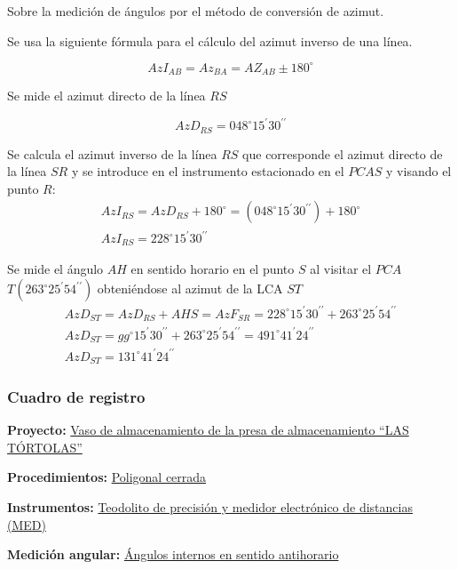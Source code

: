 Sobre la medición de ángulos por el método de conversión de azimut.

Se usa la siguiente fórmula para el cálculo del azimut inverso de una línea.

\begin{equation}
    AzI_{AB}=Az_{BA}=AZ_{AB}\pm 180^{\circ}
\end{equation}

Se mide el azimut directo de la línea $RS$

\begin{equation*}
    AzD_{RS}=048^{\circ}15^{\prime}30^{\prime\prime}
\end{equation*}

Se calcula el azimut inverso de la línea $RS$ que corresponde el azimut directo de la línea $SR$ y se introduce en el instrumento estacionado en el $PCAS$ y visando el punto $R$:
\begin{align*}
    AzI_{RS}=AzD_{RS}+180^{\circ}=\left(048^{\circ}15^{\prime}30^{\prime\prime} \right)+180^{\circ}\\
    AzI_{RS}= 228^{\circ}15^{\prime}30^{\prime\prime}   
\end{align*}

Se mide el ángulo $AH$ en sentido horario en el punto $S$ al visitar el $PCA$ $T\left(263^{\circ}25^{\prime}54^{\prime\prime} \right)$ obteniéndose al azimut de la LCA $ST$
\begin{align*}
    AzD_{ST}=AzD_{RS}+AHS=AzF_{SR}= 228^{\circ}15^{\prime}30^{\prime\prime}+ 263^{\circ}25^{\prime}54^{\prime\prime}\\
    AzD_{ST}= gg^{\circ}15^{\prime}30^{\prime\prime}+ 263^{\circ}25^{\prime}54^{\prime\prime}= 491^{\circ}41^{\prime}24^{\prime\prime} \\
    AzD_{ST}= 131^{\circ}41^{\prime}24^{\prime\prime}
\end{align*}

\subsubsection{Cuadro de registro}

\textbf{Proyecto:} \underline{Vaso de almacenamiento de la presa de almacenamiento ``LAS TÓRTOLAS''}

\textbf{Procedimientos:} \underline{Poligonal cerrada}

\textbf{Instrumentos:} \underline{Teodolito de precisión y medidor electrónico de distancias (MED)}

\textbf{Medición angular:} \underline{Ángulos internos en sentido antihorario}

